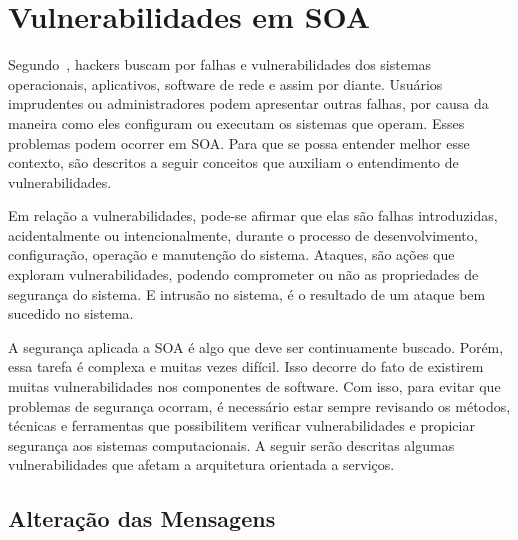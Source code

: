\section{Vulnerabilidades em SOA}\label{sec:vulnerabilidadessoa}

Segundo~\cite{Verissimo2001}, hackers buscam por falhas e vulnerabilidades dos sistemas operacionais, aplicativos, software de rede e assim por diante. Usuários imprudentes ou administradores podem apresentar outras falhas, por causa da maneira como eles configuram ou executam os sistemas que operam. Esses problemas podem ocorrer em SOA. Para que se possa entender melhor esse contexto, são descritos a seguir conceitos que auxiliam o entendimento de vulnerabilidades.

Em relação a vulnerabilidades, pode-se afirmar que elas são falhas introduzidas, acidentalmente ou intencionalmente, durante o processo de desenvolvimento, configuração, operação e manutenção do sistema. Ataques, são ações que exploram vulnerabilidades, podendo comprometer ou não as propriedades de segurança do sistema. E intrusão no sistema, é o resultado de um ataque bem sucedido no sistema.





A segurança aplicada a SOA é algo que deve ser continuamente buscado. Porém, essa tarefa é complexa e muitas vezes difícil. Isso decorre do fato de existirem muitas vulnerabilidades nos componentes de software. Com isso, para evitar que problemas de segurança ocorram, é necessário estar sempre revisando os métodos, técnicas e ferramentas que possibilitem verificar vulnerabilidades e propiciar segurança aos sistemas computacionais. A seguir serão descritas algumas vulnerabilidades que afetam a arquitetura orientada a serviços.

\subsection{Alteração das Mensagens}

